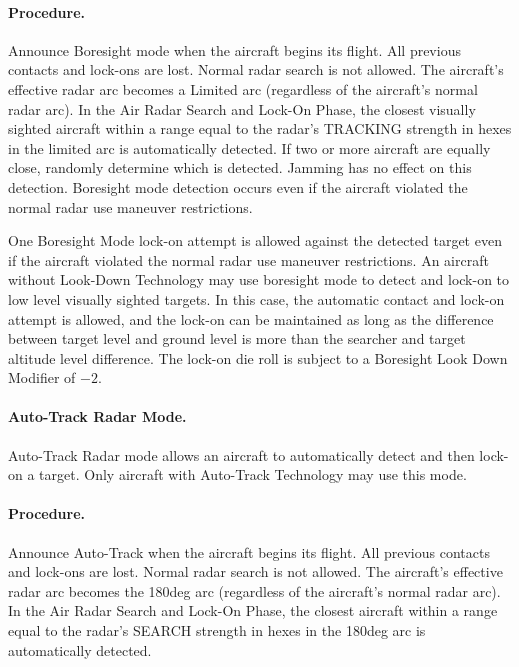 \begin{advancedrules}
\paragraph{Procedure.} Announce Boresight mode when the aircraft begins its flight. All previous contacts and lock-ons are lost. Normal radar search is not allowed. The aircraft's effective radar arc becomes a Limited arc (regardless of the aircraft's normal radar arc). In the Air Radar Search and Lock-On Phase, the closest visually sighted aircraft within a range equal to the radar's TRACKING strength in hexes in the limited arc is automatically detected. If two or more aircraft are equally close, randomly determine which is detected. Jamming has no effect on this detection. Boresight mode detection occurs even if the aircraft violated the normal radar use maneuver restrictions.

One Boresight Mode lock-on attempt is allowed against the detected target even if the aircraft violated the normal radar use maneuver restrictions. An aircraft without Look-Down Technology may use boresight mode to detect and lock-on to low level visually sighted targets. In this case, the automatic contact and lock-on attempt is allowed, and the lock-on can be maintained as long as the difference between target level and ground level is more than the searcher and target altitude level difference. The lock-on die roll is subject to a Boresight Look Down Modifier of $-2$. 

\paragraph{Auto-Track Radar Mode.} Auto-Track Radar mode allows an aircraft to automatically detect and then lock-on a target. Only aircraft with Auto-Track Technology may use this mode. 

\paragraph{Procedure.} Announce Auto-Track when the aircraft begins its flight. All previous contacts and lock-ons are lost. Normal radar search is not allowed. The aircraft's effective radar arc becomes the 180{deg} arc (regardless of the aircraft's normal radar arc). In the Air Radar Search and Lock-On Phase, the closest aircraft within a range equal to the radar's SEARCH strength in hexes in the 180{deg} arc is automatically detected.


\end{advancedrules}
